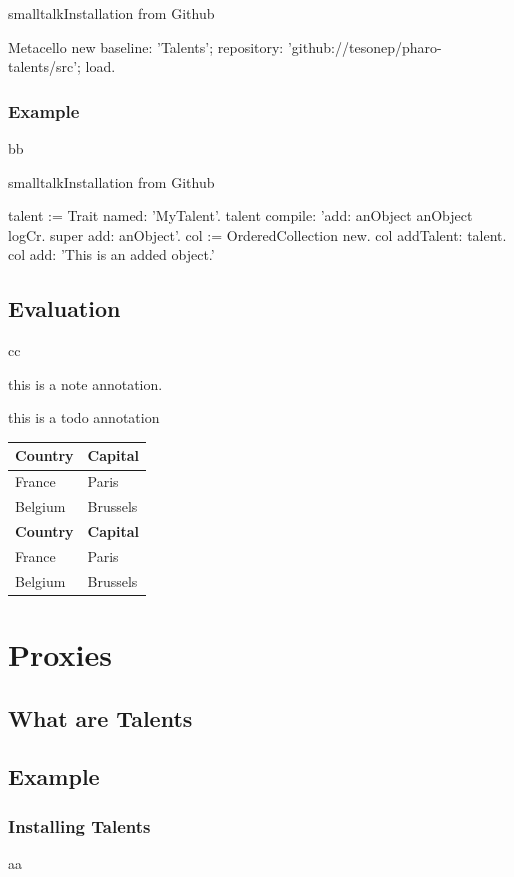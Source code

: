 \documentclass[10pt,twoside,english]{_support/latex/sbabook/sbabook}
\begin{document}
\begin{listing}[float, label=install]{smalltalk}{Installation from Github}

Metacello new
  baseline: 'Talents';
  repository: 'github://tesonep/pharo-talents/src';
  load.
\end{listing}
\subsection{Example}
bb

\begin{listing}[float, label=talent-example]{smalltalk}{Installation from Github}

talent := Trait named: 'MyTalent'.
talent compile: 'add: anObject
anObject logCr.
super add: anObject'.
col := OrderedCollection new.
col addTalent: talent.
col add: 'This is an added object.'
\end{listing}
\section{Evaluation}
cc

\begin{note}
this is a note annotation.
\end{note}

\begin{todo}
this is a todo annotation
\end{todo}

\begin{tabular}{ll}
\toprule
\textbf{Country} & \textbf{Capital} \\
\midrule
France & Paris \\
Belgium & Brussels \\
\textbf{Country} & \textbf{Capital} \\
\midrule
France & Paris \\
Belgium & Brussels \\
\bottomrule
\end{tabular}
\chapter{Proxies}\section{What are Talents}\section{Example}\subsection{Installing Talents}
aa
\end{document}
